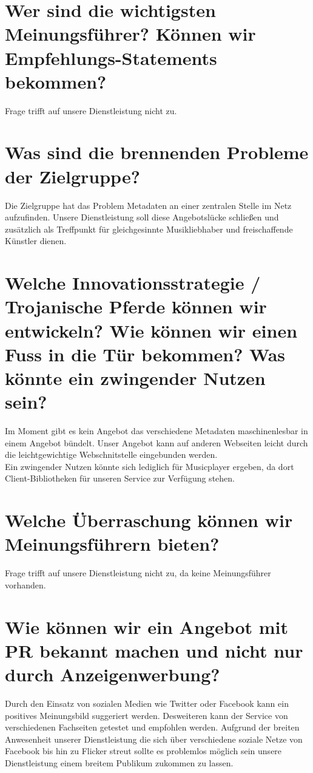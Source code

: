 \section{Wer sind die wichtigsten Meinungsführer? Können wir Empfehlungs-Statements bekommen?}
Frage trifft auf unsere Dienstleistung nicht zu.

\section{Was sind die brennenden Probleme der Zielgruppe?}
Die Zielgruppe hat das Problem Metadaten an einer zentralen Stelle im Netz
aufzufinden. Unsere Dienstleistung soll diese Angebotslücke schließen und
zusätzlich als Treffpunkt für gleichgesinnte Musikliebhaber und freischaffende
Künstler dienen.

\section{Welche Innovationsstrategie / Trojanische Pferde können wir entwickeln? Wie können wir einen Fuss in die Tür bekommen? Was könnte ein zwingender Nutzen sein?}
Im Moment gibt es kein Angebot das verschiedene Metadaten maschinenlesbar 
in einem Angebot bündelt. Unser Angebot kann auf anderen Webseiten leicht durch
die leichtgewichtige Webschnitstelle eingebunden werden.
\\
Ein zwingender Nutzen könnte sich lediglich für Musicplayer ergeben, da dort 
Client-Bibliotheken für unseren Service zur Verfügung stehen. 

\section{Welche Überraschung können wir Meinungsführern bieten?}
Frage trifft auf unsere Dienstleistung nicht zu, da keine Meinungsführer
vorhanden.

\section{Wie können wir ein Angebot mit PR bekannt machen und nicht nur durch Anzeigenwerbung?}
Durch den Einsatz von sozialen Medien wie Twitter oder Facebook kann ein
positives Meinungsbild suggeriert werden. Desweiteren kann der Service von
verschiedenen Fachseiten getestet und empfohlen werden. Aufgrund der breiten
Anwesenheit unserer Dienstleistung die sich über verschiedene soziale Netze
von Facebook bis hin zu Flicker streut sollte es problemlos möglich sein unsere
Dienstleistung einem breitem Publikum zukommen zu lassen.

